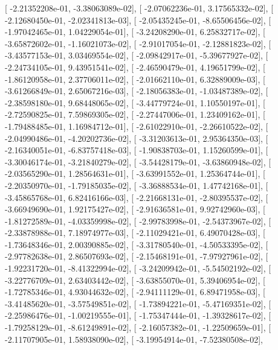 \documentclass{article}
\begin{document}
       [ -2.21352208e-01,  -3.38063089e-02],
       [ -2.07062236e-01,   3.17565332e-02],
       [ -2.12680450e-01,  -2.02341813e-03],
       [ -2.05435245e-01,  -8.65506456e-02],
       [ -1.97042465e-01,   1.04229054e-01],
       [ -3.24208290e-01,   6.25832717e-02],
       [ -3.65872602e-01,  -1.16021073e-02],
       [ -2.91017054e-01,  -2.12881823e-02],
       [ -3.43577153e-01,   3.03469554e-02],
       [ -2.09842917e-01,  -5.39677927e-02],
       [ -2.24734105e-01,   9.43951541e-02],
       [ -2.46590479e-01,   4.19651799e-02],
       [ -1.86120958e-01,   2.37706011e-02],
       [ -2.01662110e-01,   6.32889009e-03],
       [ -3.61266849e-01,   2.65067216e-03],
       [ -2.18056383e-01,  -1.03487389e-02],
       [ -2.38598180e-01,   9.68448065e-02],
       [ -3.44779724e-01,   1.10550197e-01],
       [ -2.72590825e-01,   7.59869305e-02],
       [ -2.27447006e-01,   1.23409162e-01],
       [ -1.79488485e-01,   1.16984712e-01],
       [ -2.61022910e-01,  -2.26610522e-02],
       [ -2.04990486e-01,  -4.20202736e-02],
       [ -3.31203613e-01,   2.95364350e-03],
       [ -2.16340051e-01,  -6.83757418e-03],
       [ -1.90838703e-01,   1.15260599e-01],
       [ -3.30046174e-01,  -3.21840279e-02],
       [ -3.54428179e-01,  -3.63860948e-02],
       [ -2.03565290e-01,   1.28564631e-01],
       [ -3.63991552e-01,   1.25364744e-01],
       [ -2.20350970e-01,  -1.79185035e-02],
       [ -3.36888534e-01,   1.47742168e-01],
       [ -3.45865768e-01,   6.82416166e-03],
       [ -2.21668131e-01,  -2.80395537e-02],
       [ -3.66949690e-01,   1.92175427e-02],
       [ -2.91636581e-01,   9.92742960e-03],
       [ -1.81272589e-01,  -4.03359998e-02],
       [ -2.99783998e-01,  -2.54373967e-02],
       [ -2.33878988e-01,   7.18974977e-03],
       [ -2.11029421e-01,   6.49070428e-03],
       [ -1.73648346e-01,   2.00390885e-02],
       [ -3.31780540e-01,  -4.50533395e-02],
       [ -2.97782638e-01,   2.86507693e-02],
       [ -2.15468191e-01,  -7.97927961e-02],
       [ -1.92231720e-01,  -8.41322994e-02],
       [ -3.24209942e-01,  -5.54502192e-02],
       [ -3.22776709e-01,   2.63403442e-02],
       [ -3.63855070e-01,   5.39406954e-02],
       [ -1.72785346e-01,   4.93044632e-02],
       [ -2.94111129e-01,   6.89471958e-03],
       [ -3.41485620e-01,  -3.57549851e-02],
       [ -1.73894221e-01,  -5.47169351e-02],
       [ -2.25986476e-01,  -1.00219555e-01],
       [ -1.75347444e-01,  -1.39328617e-02],
       [ -1.79258129e-01,  -8.61249891e-02],
       [ -2.16057382e-01,  -1.22509659e-01],
       [ -2.11707905e-01,   1.58938090e-02],
       [ -3.19954914e-01,  -7.52380508e-02],
\end{document}
